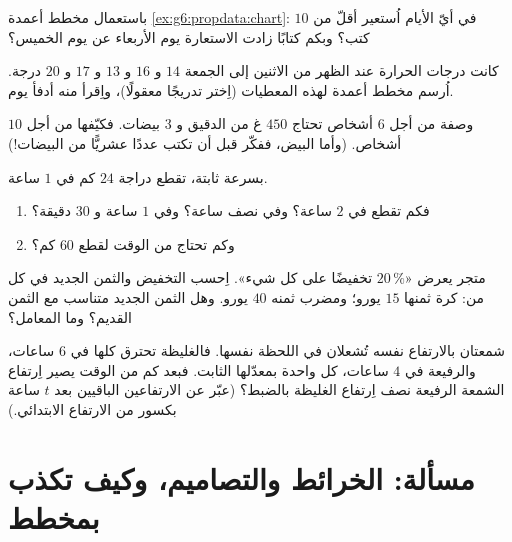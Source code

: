 \begin{exercise}[$\star$]\label{exo:g6:propdata:7}
باستعمال مخطط أعمدة \cref{ex:g6:propdata:chart}: في أيّ الأيام اُستعير
أقلّ من $10$ كتب؟ وبكم كتابًا زادت الاستعارة يوم
الأربعاء عن يوم الخميس؟
\end{exercise}

\begin{exercise}[$\star$]\label{exo:g6:propdata:8}
كانت درجات الحرارة عند الظهر من الاثنين إلى الجمعة $14$ و $16$ و $13$
و $17$ و $20$ درجة. اُرسم مخطط أعمدة لهذه المعطيات (اِختر تدريجًا
معقولًا)، واِقرأ منه أدفأ يوم.
\end{exercise}

\begin{exercise}[$\star\star$]\label{exo:g6:propdata:9}
وصفة من أجل $6$ أشخاص تحتاج $450$ غ من الدقيق و $3$ بيضات. فكيّفها
من أجل $10$ أشخاص. (وأما البيض، ففكّر قبل أن تكتب عددًا عشريًّا
من البيضات!)
\end{exercise}

\begin{exercise}[$\star\star$]\label{exo:g6:propdata:10}
بسرعة ثابتة، تقطع دراجة $24$ كم في $1$ ساعة.
\begin{enumerate}
  \item فكم تقطع في $2$ ساعة؟ وفي نصف ساعة؟ وفي
        $1$ ساعة و $30$ دقيقة؟
  \item وكم تحتاج من الوقت لقطع $60$ كم؟
\end{enumerate}
\end{exercise}

\begin{exercise}[$\star\star$]\label{exo:g6:propdata:11}
متجر يعرض «$20\,\%$ تخفيضًا على كل شيء». اِحسب التخفيض
والثمن الجديد في كل من: كرة ثمنها $15$ يورو؛ ومضرب ثمنه $40$ يورو. وهل
الثمن الجديد متناسب مع الثمن القديم؟ وما المعامل؟
\end{exercise}

\begin{exercise}[$\star\star\star$]\label{exo:g6:propdata:12}
شمعتان بالارتفاع نفسه تُشعلان في اللحظة نفسها. فالغليظة
تحترق كلها في $6$ ساعات، والرفيعة في $4$ ساعات، كل واحدة
بمعدّلها الثابت. فبعد كم من الوقت يصير اِرتفاع الشمعة الرفيعة
نصف اِرتفاع الغليظة بالضبط؟ (عبّر عن الارتفاعين الباقيين بعد
$t$ ساعة بكسور من الارتفاع الابتدائي.)
\end{exercise}

\section{مسألة: الخرائط والتصاميم، وكيف تكذب بمخطط}

